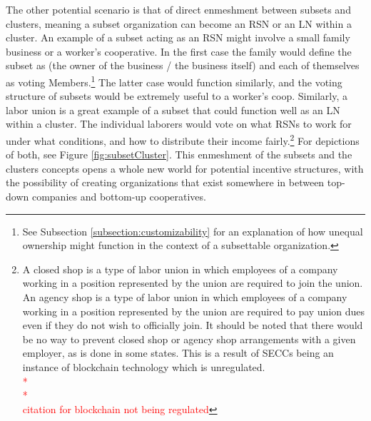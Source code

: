 \documentclass{article}[10pt]
\begin{document}
The other potential scenario is that of direct enmeshment between subsets and clusters, meaning a subset organization can become an RSN or an LN within a cluster.
An example of a subset acting as an RSN might involve a small family business or a worker's cooperative.
In the first case the family would define the subset as (the owner of the business / the business itself) and each of themselves as voting Members.\footnote{
    See Subsection \ref{subsection:customizability} for an explanation of how unequal ownership might function in the context of a subsettable organization.}
The latter case would function similarly, and the voting structure of subsets would be extremely useful to a worker's coop.
Similarly, a labor union is a great example of a subset that could function well as an LN within a cluster.
The individual laborers would vote on what RSNs to work for under what conditions, and how to distribute their income fairly.\footnote{
    A closed shop is a type of labor union in which employees of a company working in a position represented by the union are required to join the union. 
    An agency shop is a type of labor union in which employees of a company working in a position represented by the union are required to pay union dues even if they do not wish to officially join.
    It should be noted that there would be no way to prevent closed shop or agency shop arrangements with a given employer, as is done in some states.
    This is a result of SECCs being an instance of blockchain technology which is unregulated.\\
    \indent \indent {}\textcolor{red}{*}\\
    \indent \indent {}\textcolor{red}{*}\\
    \indent \indent \textcolor{red}{citation for blockchain not being regulated}}
For depictions of both, see Figure \ref{fig:subsetCluster}.
This enmeshment of the subsets and the clusters concepts opens a whole new world for potential incentive structures, with the possibility of creating organizations that exist somewhere in between top-down companies and bottom-up cooperatives.
\end{document}

